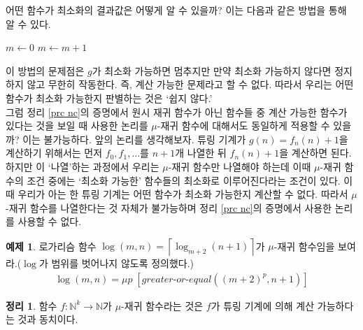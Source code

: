 \documentclass[b5paper, 11pt]{book}
\theoremstyle{definition}
\newtheorem{thm}[defn]{정리}
\newtheorem{ex}[defn]{예제}
\begin{document}
어떤 함수가 최소화의 결과값은 어떻게 알 수 있을까? 이는 다음과 같은 방법을 통해 알 수 있다.
\begin{algorithmic}
        \State $m \gets 0$
            \State $m \gets m+1$
        \EndWhile
\end{algorithmic}
이 방법의 문제점은 $g$가 최소화 가능하면 멈추지만 만약 최소화 가능하지 않다면 정지하지 않고 무한히 작동한다. 즉, 계산 가능한 문제라고 할 수 없다. 따라서 우리는 어떤 함수가 최소화 가능한지 판별하는 것은 `쉽지 않다.'\\
그럼 정리 \ref{prc nc}의 증명에서 원시 재귀 함수가 아닌 함수들 중 계산 가능한 함수가 있다는 것을 보일 때 사용한 논리를 $\mu$-재귀 함수에 대해서도 동일하게 적용할 수 있을까? 이는 불가능하다. 앞의 논리를 생각해보자. 튜링 기계가 $g(n) = f_n(n) + 1$을 계산하기 위해서는 먼저 $f_0, f_1, \ldots$를 $n+1$개 나열한 뒤 $f_n(n) + 1$을 계산하면 된다. 하지만 이 `나열'하는 과정에서 우리는 $\mu$-재귀 함수만 나열해야 하는데 이때 $\mu$-재귀 함수의 조건 중에는 `최소화 가능한' 함수들의 최소화로 이루어진다라는 조건이 있다. 이때 우리가 아는 한 튜링 기계는 어떤 함수가 최소화 가능한지 계산할 수 없다. 따라서 $\mu$-재귀 함수를 나열한다는 것 자체가 불가능하며 정리 \ref{prc nc}의 증명에서 사용한 논리를 사용할 수 없다. 
\begin{ex}
    로가리슴 함수 $\log(m,n) = \left\lceil \log_{m+2}(n+1)\right\rceil$가 $\mu$-재귀 함수임을
    보여라.($\log $가 범위를 벗어나지 않도록 정의했다.)
    \begin{align*}
        \log(m,n) = \mu p \; [greater\text{-}or\text{-}equal((m+2)^p, n+1)]
    \end{align*}
\end{ex}
\begin{thm}\label{mu eqauls tm}
    함수 $f: \mathbb{N}^k \rightarrow \mathbb{N}$가 $\mu$-재귀 함수라는 것은 $f$가 튜링 기계에 의해 계산 가능하다는 것과 동치이다.  
\end{thm}
\end{document}

